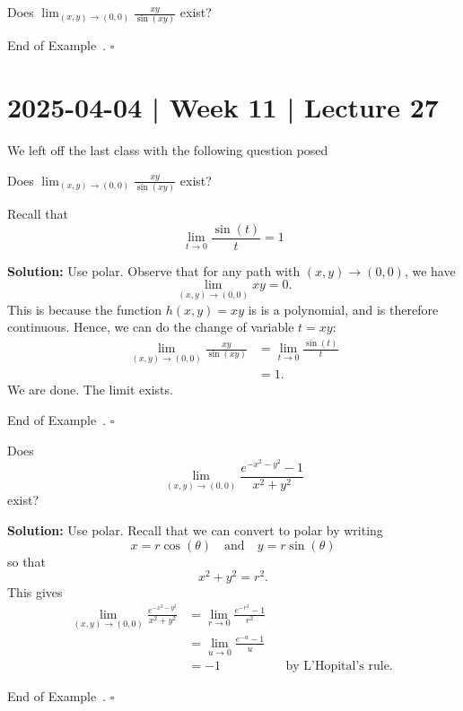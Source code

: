 \documentclass[10pt]{article}
\theoremstyle{definition}
\newtheorem{example}[theorem]{Example}
\renewenvironment{example}
{\begin{oldexample}}
  {\par\smallskip\hfill   End of Example~\theexample. $\square$    \par\end{oldexample}}
\newcommand{\fl}{\noindent\textbf} %
\newcommand{\1}[1]{\textbf{1}_{\left[#1\right]}} %
\begin{document}
\begin{example}
  Does $\lim_{(x,y)\to (0,0)} \frac{xy}{\sin(xy)}$ exist?
\end{example}

\newpage

\section{2025-04-04 | Week 11 | Lecture 27}
We left off the last class with the following question posed

\begin{example}
  Does $\lim_{(x,y)\to (0,0)} \frac{xy}{\sin(xy)}$ exist?

  Recall that
  \begin{equation*}
    \lim_{t \to 0} \frac{\sin(t)}{t} = 1
  \end{equation*}


  \fl{Solution:} Use polar. Observe that for any path with $(x,y)\to (0,0)$,
  we have
  \begin{equation*}
    \lim_{(x,y)\to (0,0)}xy = 0.
  \end{equation*}
  This is because the function $h(x,y) = xy$ is is a polynomial, and is
  therefore continuous. Hence, we can do the change of variable $t=xy$:
  \begin{align*}
    \lim_{(x,y)\to (0,0)} \frac{xy}{\sin(xy)}
    &= \lim_{t \to 0} \frac{\sin(t)}{t}\\
    &=1.
  \end{align*}
  We are done. The limit exists.
  
\end{example}

\begin{example}
  Does
  \begin{equation*}
    \lim_{(x,y)\to (0,0)} \frac{e^{-x^{2}-y^{2}}-1}{x^{2}+y^{2}}
  \end{equation*}
  exist?

  \fl{Solution:} Use polar. Recall that we can convert to polar by writing
  \begin{equation*}
    x = r\cos(\theta) \quad \text{and} \quad  y = r\sin(\theta)
  \end{equation*}
  so that
  \begin{equation*}
    x^{2}+y^{2} = r^{2}.
  \end{equation*}
  This gives
  \begin{align*}
    \lim_{(x,y)\to (0,0)}\frac{e^{-x^{2}-y^{2}}}{x^{2}+y^{2}} 
    &= \lim_{r \to 0}\frac{e^{-r^{2}}-1}{r^{2}}\\
    &= \lim_{u \to 0} \frac{e^{-u}-1}{u}\\
    &= -1 &&\text{by L'Hopital's rule. }
\end{align*}
 
\end{example}
\end{document}
